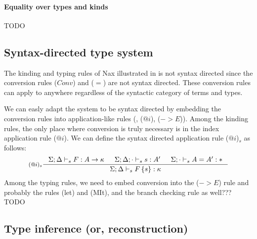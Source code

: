 \paragraph{Equality over types and kinds}
TODO

\subsection{Syntax-directed type system}
The kinding and typing rules of Nax illustrated in  is not
syntax directed since the conversion rules ($Conv$) and ($=$) are not syntax
directed. These conversion rules can apply to anywhere regardless of the
syntactic category of terms and types.

We can easly adapt the system to be syntax directed by embedding
the conversion rules into application-like rules (\eg, ($@i$), ($->$$E$)).
Among the kinding rules, the only place where conversion is truly necessary
is in the index application rule ($@i$).
We can define the syntax directed application rule ($@i$)$_s$ as follows:
\[ \inference[($@i$)$_s$]{ \Sigma;\Delta |-_s F : A -> \kappa
                     & \Sigma;\Delta;\cdot |-_s s : A'
                     & \Sigma;\cdot |-_s A=A' : * }
                     {\Sigma;\Delta |-_s F\,\{s\} : \kappa}
\]
Among the typing rules, we need to embed conversion into the ($->$$E$) rule
and probably the rules (let) and (MIt), and the branch checking rule as well???
TODO

\subsection{Type inference (or, reconstruction)}

\newcommand{\return}[0]{\mathrel{\rhd}}
\newcommand{\fresh}[0]{\textit{fresh}}
\newcommand{\frvar}[0]{\textit{frvar}}
\newcommand{\unify}[0]{\textit{unify}}
